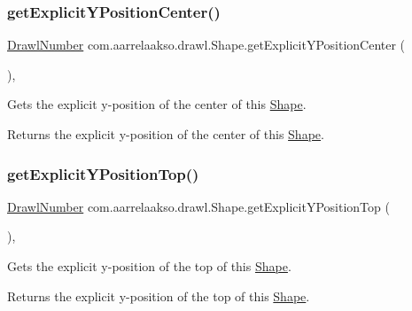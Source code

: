 \subsubsection{\texorpdfstring{get\+Explicit\+Y\+Position\+Center()}{getExplicitYPositionCenter()}}
{\footnotesize\ttfamily \hyperlink{classcom_1_1aarrelaakso_1_1drawl_1_1_drawl_number}{Drawl\+Number} com.\+aarrelaakso.\+drawl.\+Shape.\+get\+Explicit\+Y\+Position\+Center (\begin{DoxyParamCaption}{ }\end{DoxyParamCaption})\hspace{0.3cm}{\ttfamily [protected]}, {\ttfamily [inherited]}}



Gets the explicit y-\/position of the center of this \hyperlink{classcom_1_1aarrelaakso_1_1drawl_1_1_shape}{Shape}. 

\begin{DoxyReturn}{Returns}
the explicit y-\/position of the center of this \hyperlink{classcom_1_1aarrelaakso_1_1drawl_1_1_shape}{Shape}. 
\end{DoxyReturn}
\mbox{\label{classcom_1_1aarrelaakso_1_1drawl_1_1_shape_a95f8a2f107299d91813627a95b3e0f0f}} 
\subsubsection{\texorpdfstring{get\+Explicit\+Y\+Position\+Top()}{getExplicitYPositionTop()}}
{\footnotesize\ttfamily \hyperlink{classcom_1_1aarrelaakso_1_1drawl_1_1_drawl_number}{Drawl\+Number} com.\+aarrelaakso.\+drawl.\+Shape.\+get\+Explicit\+Y\+Position\+Top (\begin{DoxyParamCaption}{ }\end{DoxyParamCaption})\hspace{0.3cm}{\ttfamily [protected]}, {\ttfamily [inherited]}}



Gets the explicit y-\/position of the top of this \hyperlink{classcom_1_1aarrelaakso_1_1drawl_1_1_shape}{Shape}. 

\begin{DoxyReturn}{Returns}
the explicit y-\/position of the top of this \hyperlink{classcom_1_1aarrelaakso_1_1drawl_1_1_shape}{Shape}. 
\end{DoxyReturn}
\mbox{\label{classcom_1_1aarrelaakso_1_1drawl_1_1_shape_a0d9a33a3e151aaceeec140bea343a650}} 
